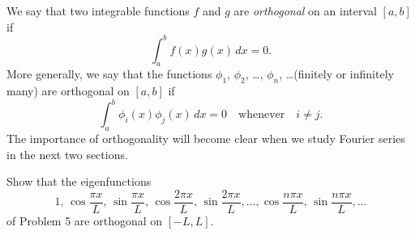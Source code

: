 
We say that two integrable functions $f$ and $g$ are
\emph{\color{blue}orthogonal} on an interval $[a,b]$ if
\[
\int_a^bf(x)g(x)\,dx=0.
\]
More generally, we say that the functions $\phi_1$, $\phi_2$, \dots,
$\phi_n$, \dots (finitely or infinitely many) are orthogonal
on $[a,b]$  if
\[
\int_a^b\phi_i(x)\phi_j(x)\,dx=0\quad\text{whenever}\quad
i\ne j.
\]
The  importance of orthogonality will become clear when we study
Fourier
 series in the next two sections.

\begin{example}\label{example:11.1.4}
Show that the eigenfunctions
\begin{equation} \label{eq:11.1.11}
1,\, \cos\frac{\pi x}{L},\, \sin\frac{\pi x}{L},
\, \cos\frac{2\pi x}{L}, \, \sin\frac{2\pi x}{L},\dots,
\cos\frac{n\pi x}{L}, \, \sin\frac{n\pi x}{L},\dots
\end{equation}
of Problem 5
are orthogonal on $[-L,L]$.
\end{example}


